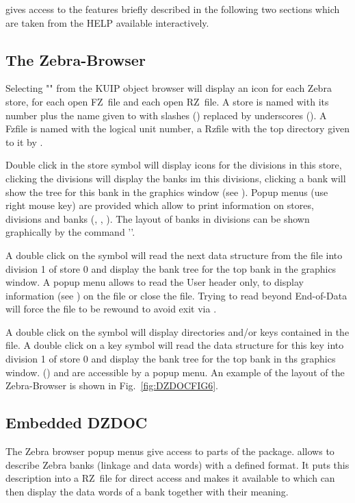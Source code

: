  
gives access to the features briefly described in the following two
sections which are taken from the HELP available interactively.
 
\subsection{The Zebra-Browser}
 
Selecting "" from the KUIP object browser will display
an icon for each Zebra store, for each open FZ~file and each
open RZ~file. A store is named with its number plus the name
given to  with slashes (\Lit{/}) replaced by underscores (\Lit{_}).
A Fzfile is named with the logical unit number, a Rzfile with
the top directory given to it by .
 
Double click in the store symbol will display icons for the
divisions in this store, clicking the divisions will display
the banks im this divisions, clicking a bank will show the
tree for this bank in the graphics window (see ).
Popup menus (use right mouse key) are provided which allow to
print information on stores, divisions and banks (,
, ). The layout of banks in divisions can be
shown graphically by the command ''.
 
A double click on the  symbol will read the next data
structure from the file into division 1 of store 0 and
display the bank tree for the top bank in the graphics
window. A popup menu allows to read the User header only,
to display information (see ) on the file or close the
file. Trying to read beyond End-of-Data will force the
file to be rewound to avoid exit via .
 
A double click on the  symbol will display directories
and/or keys contained in the file. A double click on a key
symbol will read the data structure for this key into
division 1 of store 0 and display the bank tree for the
top bank in ths graphics window.  () and
 are accessible by a popup menu.
An example of the layout of the Zebra-Browser is shown in 
Fig.~\ref{fig:DZDOCFIG6}.
 
\subsection{Embedded DZDOC}
 
The Zebra browser popup menus give access to parts of the
 package. 
 allows to describe Zebra banks (linkage
and data words) with a defined format.
It puts this description into a RZ~file for direct access
and makes it available to  which can then display the
data words of a bank together with their meaning.
 
